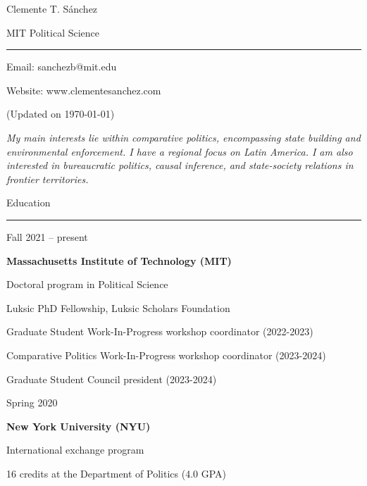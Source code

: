 \documentclass[a4paper, 12pt]{article}
\begin{document}
\Huge{Clemente T. Sánchez}

\medskip

\large{MIT Political Science}

\smallskip

\rule{\textwidth}{2pt}

\medskip

\normalsize

Email: sanchezb@mit.edu

Website: www.clementesanchez.com

\bigskip





(Updated on \today)

\justify\small\textit{My main interests lie within comparative politics, encompassing state building and environmental enforcement. I have a regional focus on Latin America. I am also interested in bureaucratic politics, causal inference, and state-society relations in frontier territories.}

\bigskip





\large Education

\smallskip

\hrule

\normalsize

\begin{multicols}{2}

Fall 2021 -- present

\columnbreak

\begin{flushright}

\textbf{Massachusetts Institute of Technology (MIT)}

\medskip

Doctoral program in Political Science

Luksic PhD Fellowship, Luksic Scholars Foundation

Graduate Student Work-In-Progress workshop coordinator (2022-2023)

Comparative Politics Work-In-Progress workshop coordinator (2023-2024)

Graduate Student Council president (2023-2024)


\end{flushright}

\end{multicols}

\begin{multicols}{2}

Spring 2020

\columnbreak

\begin{flushright}

\textbf{New York University (NYU)}

\medskip

International exchange program

16 credits at the Department of Politics (4.0 GPA)

\end{flushright}

\end{multicols}
\end{document}
